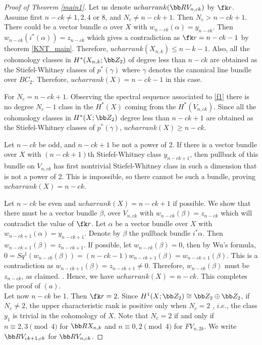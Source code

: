 \begin{proof}[Proof of Theorem \ref{main1}]
    Let us denote $ucharrank(\bb RV_{n, ck})$ by $\fk r$. \\

    Assume first  $n-ck\neq 1, 2, 4$ or $8$, and $N_c\neq n-ck+1$. Then $N_c> n-ck+1$. There could be a vector bundle $\alpha$ over $X$ with $w_{n-ck}(\alpha)=y_{n-ck}$. Then $w_{n-ck}(i^*(\alpha))=z_{n-ck}$ which gives a contradiction as $\fk r = n-ck-1$ by theorem \ref{KNT_main}. Therefore, $ucharrank(X_{n,k})\leq  n-k-1$. Also, all the cohomology classes in $H^*(X_{n,k}; \bb Z_2)$ of degree less than $n-ck$ are obtained as the Stiefel-Whitney classes of $p^*(\gamma )$ where $\gamma$ denotes the canonical line bundle over $BC_2$. Therefore, $ucharrank(X)= n-ck-1$ in this case.
    
    For $N_c=n-ck+1$. Observing the spectral sequence associated to \eqref{f1} there is no degree $N_c-1$ class in the $H^*(X)$ coming from the $H^*(V_{n,ck})$. Since all the cohomology classes in $H^*(X; \bb Z_2)$  degree less than $n-ck+1$ are obtained as the Stiefel-Whitney classes of $p^*(\gamma)$, $ucharrank(X)\ge n-ck$. 
    
    Let $n-ck$ be odd, and $n-ck+1$ be not a power of 2. If there is a vector bundle over $X$ with $(n-ck+1)$th Stiefel-Whitney class $y_{n-ck+1}$, then pullback of this bundle on $V_{n,ck}$ has first nontrivial Stiefel-Whitney class in such a dimension that is not a power of 2. This is impossible, so there cannot be such a bundle, proving $ucharrank(X)=n-ck$.
    
 Let $n-ck$ be even and $ucharrank(X) = n-ck+1$ if possible. We show that there must be a vector bundle $\beta$, over $V_{n, ck}$ with $w_{n-ck}(\beta)=z_{n-ck}$ which will contradict the value of $\fk r$. Let $\alpha$ be a vector bundle over $X$ with $w_{n-ck+1}(\alpha)=y_{n-ck+1}$. Denote by $\beta$ the pullback bundle $i^*\alpha$. Then $w_{n-ck+1}(\beta) = z_{n-ck+1}$. If possible, let $w_{n-ck}(\beta) = 0$, then by Wu's formula, $0=Sq^1(w_{n-ck}(\beta))=(n-ck-1)w_{n-ck+1}(\beta)=w_{n-ck+1}(\beta)$. This is a contradiction as $w_{n-ck+1}(\beta)=z_{n-ck+1}\neq 0$. Therefore, $w_{n-ck}(\beta)$ must be $z_{n-ck}$, as claimed. . Hence, we have $ucharrank(X)=n-ck$. This completes the proof of $(a)$.\\

    


    Let now $n-ck$ be $1$. Then $\fk r=2$. Since $H^1(X; \bb Z_2)\cong \bb Z_2\oplus \bb Z_2$, if $N_c\neq 2$, the upper characteristic rank is positive only when $N_c=2$ , $i.e.$,  the class $y_1$ is trivial in the cohomology of $X$. Note that $N_c=2$ if and only if $n\equiv 2, 3\pmod 4$ for $\bb RX_{n,k}$ and $n\equiv 0, 2\pmod 4$ for $FV_{n, 2k}$.  We write $\bb RV_{ck+1, ck}$ for $\bb RV_{n,ck}$.
    

\end{proof}
